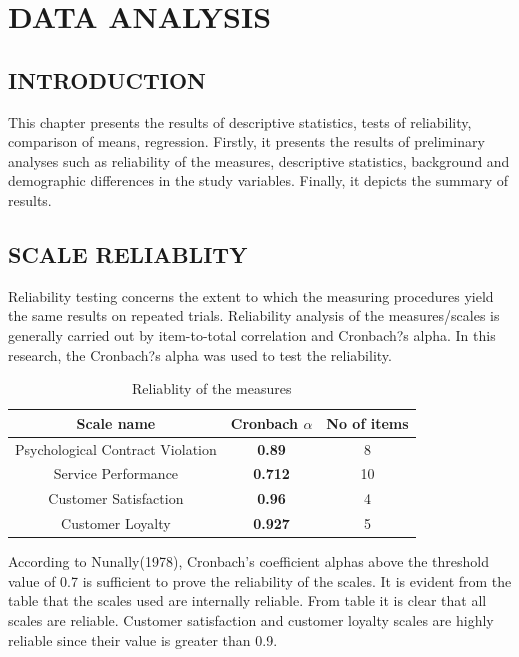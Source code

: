 \documentclass[a4paper, 14pt]{extarticle}
\begin{document}
{\section{DATA ANALYSIS}
\subsection{INTRODUCTION}
This chapter presents the results of descriptive statistics, tests of reliability, comparison of means, regression. Firstly, it presents the results of preliminary analyses such as reliability of the measures, descriptive statistics, background and demographic differences in the study variables. Finally, it depicts the summary of results.

\subsection{SCALE RELIABLITY}
Reliability testing concerns the extent to which the measuring procedures yield the same results on repeated trials. Reliability analysis of the measures/scales is generally carried out by item-to-total correlation and Cronbach?s alpha. In this research, the Cronbach?s  alpha was used to test the reliability.
\begin{table}[H]
\centering
\begin{tabular}{|c|c|c|}
\hline
\textbf{Scale name} & \textbf{Cronbach $\alpha$} & \textbf{No of items}\\
\hline
Psychological Contract Violation & \textbf{0.89} & 8\\
\hline
Service Performance & \textbf{0.712} & 10\\
\hline
Customer Satisfaction & \textbf{0.96} & 4\\
\hline
Customer Loyalty & \textbf{0.927} & 5 \\
\hline
\end{tabular}
\caption{Reliablity of the measures}
\end{table}

\par According to Nunally(1978), Cronbach's coefficient alphas above the threshold value of 0.7 is sufficient to prove the reliability of the scales. It is evident from the table that the scales used are internally reliable. From table it is clear that all scales are reliable. Customer satisfaction and customer loyalty scales are highly reliable since their value is greater than 0.9.

}
\end{document}
